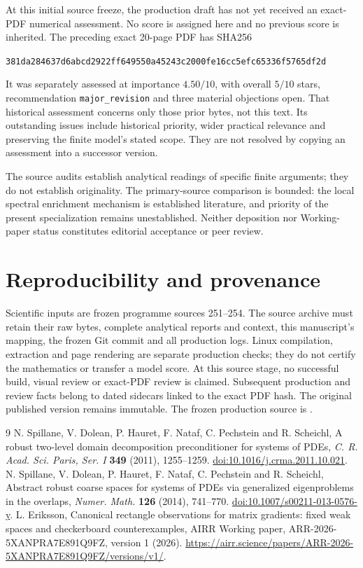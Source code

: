 \documentclass[11pt,a4paper]{article}
\providecommand{\SourceCommit}{\errmessage{A frozen SourceCommit must be supplied}}
\begin{document}
At this initial source freeze, the production draft has not yet received an exact-PDF numerical
assessment. No score is assigned here and no previous score is inherited.
The preceding exact 20-page PDF has SHA256
\begin{center}
\small\texttt{381da284637d6abcd2922ff649550a45243c2000fe16cc5efc65336f5765df2d}
\end{center}
It was separately assessed at importance $4.50/10$, with overall $5/10$ stars,
recommendation \texttt{major\_revision} and three material objections open.
That historical assessment concerns only those prior bytes, not this text.
Its outstanding issues include historical priority, wider practical relevance
and preserving the finite model's stated scope. They are not resolved by
copying an assessment into a successor version.

The source audits establish analytical readings of specific finite arguments;
they do not establish originality. The primary-source comparison is bounded:
the local spectral enrichment mechanism is established literature, and priority
of the present specialization remains unestablished. Neither deposition nor
Working-paper status constitutes editorial acceptance or peer review.

\section*{Reproducibility and provenance}
Scientific inputs are frozen programme sources 251--254. The source archive
must retain their raw bytes, complete analytical reports and context, this
manuscript's mapping, the frozen Git commit and all production logs. Linux
compilation, extraction and page rendering are separate production checks;
they do not certify the mathematics or transfer a model score. At this source
stage, no successful build, visual review or exact-PDF review is claimed.
Subsequent production and review facts belong to dated sidecars linked to the
exact PDF hash. The original published version remains immutable.
The frozen production source is \texttt{\SourceCommit}.

\begin{thebibliography}{9}
N. Spillane, V. Dolean, P. Hauret, F. Nataf, C. Pechstein and R. Scheichl,
A robust two-level domain decomposition preconditioner for systems of PDEs,
\emph{C. R. Acad. Sci. Paris, Ser. I} \textbf{349} (2011), 1255--1259.
\href{https://doi.org/10.1016/j.crma.2011.10.021}{doi:10.1016/j.crma.2011.10.021}.
N. Spillane, V. Dolean, P. Hauret, F. Nataf, C. Pechstein and R. Scheichl,
Abstract robust coarse spaces for systems of PDEs via generalized eigenproblems
in the overlaps, \emph{Numer. Math.} \textbf{126} (2014), 741--770.
\href{https://doi.org/10.1007/s00211-013-0576-y}{doi:10.1007/s00211-013-0576-y}.
L. Eriksson, Canonical rectangle observations for matrix gradients: fixed weak
spaces and checkerboard counterexamples, AIRR Working paper,
ARR-2026-5XANPRA7E891Q9FZ, version 1 (2026).
\url{https://airr.science/papers/ARR-2026-5XANPRA7E891Q9FZ/versions/v1/}.
\end{thebibliography}
\end{document}
